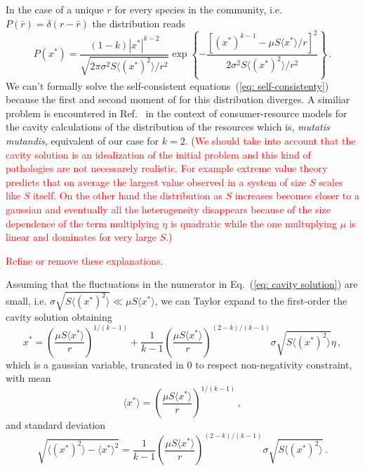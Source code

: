 \documentclass[10pt]{article}
\begin{document}
In the case of a unique $r$ for every species in the community, i.e. $P(\bar{r})=\delta(r-\bar{r})$
the distribution reads
\begin{equation}
    P(x^*)=\frac{(1-k)|x^*|^{k-2}}{\sqrt{2\pi \sigma^2 S\langle (x^*)^2 \rangle/r^2}}
    \exp{\left\{-\frac{\left[(x^*)^{k-1}-\mu S\langle x^*\rangle/r\right]^2}{2\sigma^2S\langle (x^*)^2 \rangle/r^2}\right\}} \, .
    \label{eq: species dist unique r}
\end{equation}
We can't formally solve the self-consistent equations~(\ref{eq: self-consistenty})
because the first and second moment of  for this distribution diverges.
A similiar problem is encountered in Ref.~\cite{Cui2020}
in the context of consumer-resource models for the cavity calculations of
the distribution of the resources which is, \textit{mutatis mutandis}, 
equivalent of our case for $k=2$. (\textcolor{red}{We should take into account that
the cavity solution is an idealization of the initial problem and 
this kind of pathologies are not necessarely realistic.
For example extreme value theory~\cite{Majumdar2020} predicts that on average the largest
value observed in a system of
size $S$ scales like $S$ itself. On the other hand the distribution as $S$ increases
becomes closer to a gaussian and eventually all the heterogeneity disappears
because of the size dependence of the term multiplying $\eta$ is quadratic while the
one multuplying $\mu$ is linear and dominates for very large $S$.})

\textcolor{red}{Refine or remove these explanations.}

Assuming that the fluctuations in the numerator in Eq.~(\ref{eq: cavity solution})
are small, i.e. $\sigma \sqrt{S\langle (x^*)^2\rangle}\ll \mu S \langle x^* \rangle$,
we can Taylor expand to the first-order the cavity solution obtaining
\begin{equation}
    x^* = \left(\frac{ \mu S \langle x^* \rangle}{r}\right)^{1/(k-1)} +
    \frac{1}{k-1}\left(\frac{ \mu S \langle x^* \rangle}{r}\right)^{(2-k)/(k-1)}\sigma \sqrt{S\langle (x^*)^2\rangle}\eta \, ,
\end{equation}
which is a gaussian variable, truncated in 0 to respect
non-negativity constraint, with mean
\begin{equation}
    \langle x^* \rangle = \left(\frac{ \mu S \langle x^* \rangle}{r}\right)^{1/(k-1)} \, ,
\end{equation}
and standard deviation
\begin{equation}
    \sqrt{\langle (x^*)^2 \rangle - \langle x^* \rangle^2} =
    \frac{1}{k-1}\left(\frac{ \mu S \langle x^* \rangle}{r}\right)^{(2-k)/(k-1)}\sigma \sqrt{S\langle (x^*)^2\rangle} \, .
\end{equation}
\end{document}
